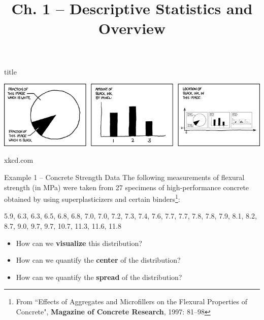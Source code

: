 \documentclass{beamer}
\title{Ch. 1 -- Descriptive Statistics and Overview}
\renewcommand{\emph}{\textbf}
\begin{document}
\begin{frame}
\begin{beamercolorbox}[rounded=true,wd=\textwidth,center]{title}
\inserttitle
\end{beamercolorbox}%
\vspace{1cm}
\begin{center}
\hspace*{-.7cm}\includegraphics[scale=.52]{self_description.png}
\end{center}
\hfill\tiny xkcd.com
\end{frame} 

\begin{frame}{Example 1 -- Concrete Strength Data}
The following measurements of flexural strength (in MPa) were taken from 27 specimens of high-performance concrete obtained by using superplasticizers and certain binders\footnote{From ``Effects of Aggregates and Microfillers on the Flexural Properties of Concrete", \emph{Magazine of Concrete Research}, 1997: 81--98}:

\vspace{.5cm}
5.9,
6.3,
6.3,
6.5,
6.8,
6.8,
7.0,
7.0,
7.2,
7.3,
7.4,
7.6,
7.7,
7.7,
7.8,
7.8,
7.9,
8.1,
8.2,
8.7,
9.0,
9.7,
9.7,
10.7,
11.3,
11.6,
11.8

\begin{itemize}
\item How can we \emph{visualize} this distribution?
\item How can we quantify the \emph{center} of the distribution?
\item How can we quantify the \emph{spread} of the distribution?
\end{itemize}
\end{frame}
\end{document}
